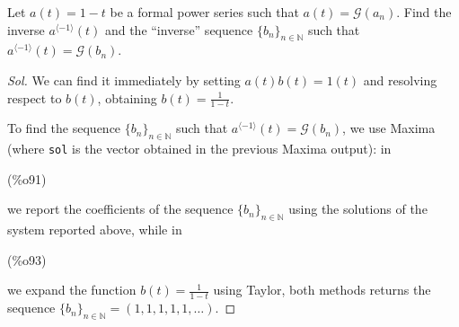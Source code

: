 \begin{exercise}
  Let $a(t) = 1-t$ be a formal power series such that $a(t) =
  \mathcal{G} (a_n)$. Find the inverse $a^{\langle -1\rangle}(t)$ and
  the ``inverse'' sequence $\{b_n\}_{n\in\mathbb{N} } $ such that
  $a^{\langle -1\rangle}(t) = \mathcal{G}(b_n) $.
\end{exercise}
\begin{proof}[Sol]
  We can find it immediately by setting $a(t)b(t)=1(t)$ and resolving
  respect to $b(t)$, obtaining $b(t) = \frac{1}{1-t} $.

  To find the sequence $\{b_n\}_{n\in\mathbb{N} } $ such that
  $a^{\langle -1\rangle}(t) = \mathcal{G}(b_n) $, we use Maxima (where
  \texttt{\color{blue}sol} is the vector obtained in the previous
  Maxima output): in \parbox{8ex}{\color{labelcolor}(\%o91) } we
  report the coefficients of the sequence $\{b_n\}_{n\in\mathbb{N} } $
  using the solutions of the system reported above, while
  in \parbox{8ex}{\color{labelcolor}(\%o93) } we expand the function
  $b(t) = \frac{1}{1-t} $ using Taylor, both methods returns the
  sequence $\{b_n\}_{n\in\mathbb{N} } = (1,1,1,1,1,\ldots)$.
  

\end{proof}
